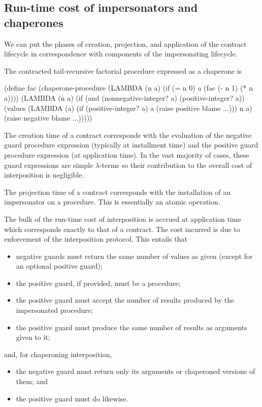 \documentclass{sigplanconf}
\begin{document}
\subsection{Run-time cost of impersonators and chaperones}

We can put the phases of creation, projection, and application of the contract lifecycle in correspondence with components of the impersonating lifecycle.

The contracted tail-recursive factorial procedure expressed as a chaperone is
\begin{schemedisplay}
(define fac (chaperone-procedure
             (LAMBDA (n a)
               (if (= n 0)
                   a
                   (fac (- n 1) (* n a))))
             (LAMBDA (n a)
               (if (and (nonnegative-integer? a)
                        (positive-integer? a))
                   (values (LAMBDA (a)
                             (if (positive-integer? a)
                                 a
                                 (raise positive blame ...)))
                           n a)
                   (raise negative blame ...)))))
\end{schemedisplay}

The creation time of a contract corresponds with the evaluation of the negative guard procedure expression (typically at installment time) and the positive guard procedure expression (at application time).
In the vast majority of cases, these guard expressions are simple $\lambda$-terms so their contribution to the overall cost of interposition is negligible.

The projection time of a contract corresponds with the installation of an impersonator on a procedure.
This is essentially an atomic operation.

The bulk of the run-time cost of interposition is accrued at application time which corresponds exactly to that of a contract.
The cost incurred is due to enforcement of the interposition protocol.
This entails that
\begin{itemize}
\item negative guards must return the same number of values as given (except for an optional positive guard);
\item the positive guard, if provided, must be a procedure;
\item the positive guard must accept the number of results produced by the impersonated procedure;
\item the positive guard must produce the same number of results as arguments given to it;
\end{itemize}
and, for chaperoning interposition,
\begin{itemize}
\item the negative guard must return only its arguments or chaperoned versions of them; and
\item the positive guard must do likewise.
\end{itemize}
\end{document}
